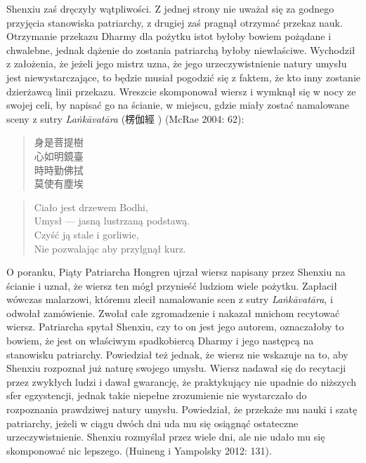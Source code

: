 Shenxiu zaś dręczyły wątpliwości. Z jednej strony nie uważał się za godnego przyjęcia stanowiska patriarchy, z drugiej zaś pragnął otrzymać przekaz nauk. Otrzymanie przekazu Dharmy dla pożytku istot byłoby bowiem pożądane i chwalebne, jednak dążenie do zostania patriarchą byłoby niewłaściwe. Wychodził z założenia, że jeżeli jego mistrz uzna, że jego urzeczywistnienie natury umysłu jest niewystarczające, to będzie musiał pogodzić się z faktem, że kto inny zostanie dzierżawcą linii przekazu. Wreszcie skomponował wiersz i wymknął się w nocy ze swojej celi, by napisać go na ścianie, w miejscu, gdzie miały zostać namalowane sceny z sutry \textit{La\.nkāvatāra} (楞伽經 ) (McRae 2004: 62):

\vspace*{6pt}
\begin{minipage}[t]{0.4\textwidth}
\begin{verse}
身是菩提樹\\
心如明鏡臺\\
時時勤佛拭\\
莫使有塵埃
\end{verse}
\end{minipage}
\begin{minipage}[t]{0.6\textwidth}
\itshape
\begin{verse}
Ciało jest drzewem Bodhi,\\
Umysł --- jasną lustrzaną podstawą.\\
Czyść ją stale i gorliwie,\\
Nie pozwalając aby przylgnął kurz.\fnm
\end{verse}
\end{minipage}
\label{ShenxiuVerse}
\vspace*{6pt}

O poranku, Piąty Patriarcha Hongren ujrzał wiersz napisany przez Shenxiu na ścianie i uznał, że wiersz ten mógł przynieść ludziom wiele pożytku. Zapłacił wówczas malarzowi, któremu zlecił namalowanie scen z sutry \textit{La\.nkāvatāra}, i odwołał zamówienie. Zwołał całe zgromadzenie i nakazał mnichom recytować wiersz. Patriarcha spytał Shenxiu, czy to on jest jego autorem, oznaczałoby to bowiem, że jest on właściwym spadkobiercą Dharmy i jego następcą na stanowisku patriarchy. Powiedział też jednak, że wiersz nie wskazuje na to, aby Shenxiu rozpoznał już naturę swojego umysłu. Wiersz nadawał się do recytacji przez zwykłych ludzi i dawał gwarancję, że praktykujący nie upadnie do niższych sfer egzystencji, jednak takie niepełne zrozumienie nie wystarczało do rozpoznania prawdziwej natury umysłu. Powiedział, że przekaże mu nauki i szatę patriarchy, jeżeli w ciągu dwóch dni uda mu się osiągnąć ostateczne urzeczywistnienie. Shenxiu rozmyślał przez wiele dni, ale nie udało mu się skomponować nic lepszego. (Huineng i Yampolsky 2012: 131).

